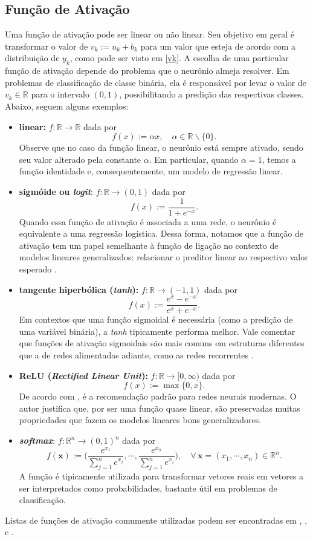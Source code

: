 \documentclass{automatextcc}
\newcommand{\R}{\mathds{R}}
\newcommand{\bs}[1]{\boldsymbol{#1}}
\begin{document}
\subsection{Função de Ativação}
Uma função de ativação pode ser linear ou não linear. Seu objetivo em geral é transformar o valor de $v_k := u_k + b_k$ para um valor que esteja de acordo com a distribuição de $y_k$, como pode ser visto em \eqref{vk}. A escolha de uma particular função de ativação depende do problema que o neurônio almeja resolver. Em problemas de classificação de classe binária, ela é responsável por levar o valor de $v_k \in \R$ para o intervalo $(0,1)$, possibilitando a predição das respectivas classes. Abaixo, seguem alguns exemplos:
\begin{itemize}
    \item \textbf{linear:} $f: \R \rightarrow \R$ dada por 
    \[f(x) := \alpha x, \quad \alpha \in \R\backslash\{0\}.\]
    Observe que no caso da função linear, o neurônio está sempre ativado, sendo seu valor alterado pela constante $\alpha$. Em particular, quando $\alpha=1$, temos a função identidade e, consequentemente, um modelo de regressão linear.
    \item \textbf{sigmóide ou \textit{logit}}: $f: \R \rightarrow (0,1)$ dada por 
    \[f(x) := \frac{1}{1 + e^{-x}}.\]
    Quando essa função de ativação é associada a uma rede, o neurônio é equivalente a uma regressão logística. Dessa forma, notamos que a função de ativação tem um papel semelhante à função de ligação no contexto de modelos lineares generalizados: relacionar o preditor linear ao respectivo valor esperado \citep{sarle1994,frei2020,mccullagh1989}.
    \item \textbf{tangente hiperbólica (\textit{tanh}):}  $f:\R \rightarrow (-1,1)$ dada por 
    \[f(x) := \frac{e^{x}-e^{-x}}{e^{x}+e^{-x}}.\]
    Em contextos que uma função sigmoidal é necessária (como a predição de uma variável binária), a \textit{tanh} tipicamente performa melhor. Vale comentar que funções de ativação sigmoidais são mais comuns em estruturas diferentes que a de redes alimentadas adiante, como as redes recorrentes \citep{goodfellow2016}.  
    \item \textbf{ReLU (\textit{Rectified Linear Unit}):} $f: \R \rightarrow [0,\infty)$ dada por 
    \[f(x) := \max\{0,x\}.\]
    De acordo com \citet{goodfellow2016}, é a recomendação padrão para redes neurais modernas. O autor justifica que, por ser uma função quase linear, são preservadas muitas propriedades que fazem os modelos lineares bons generalizadores. 
    \item \textbf{\textit{softmax}}: $f:\R^n\rightarrow (0,1)^n$ dada por 
    \[f(\bs x):=\bigg(\frac{e^{x_1}}{\sum_{j=1}^n e^{x_j}},\cdots, \frac{e^{x_n}}{\sum_{j=1}^n e^{x_j}}\bigg), \quad \forall\,\bs x=(x_1,\cdots,x_n)\in\R^n.\]
    {A função} é tipicamente utilizada para transformar vetores reais em vetores a ser interpretados como probabilidades, bastante útil em problemas de classificação.
\end{itemize}
Listas de funções de ativação comumente utilizadas podem ser encontradas em \citet{hastie2008}, \citet{hagan2014}, \citet{aggarwal2018} e \citet{dsa2022}.
\end{document}
